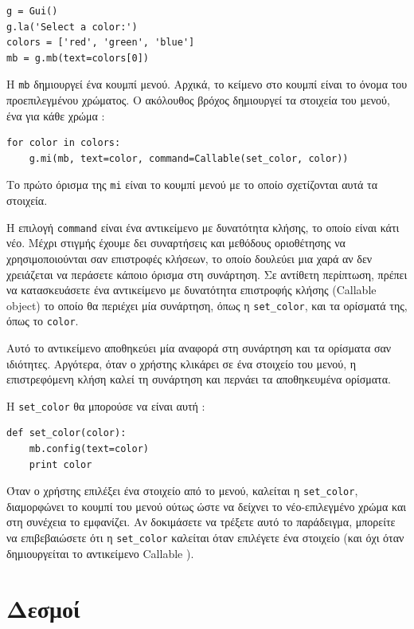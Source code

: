 \documentclass[10pt]{book}
\begin{document}
\begin{verbatim}
g = Gui()
g.la('Select a color:')
colors = ['red', 'green', 'blue']
mb = g.mb(text=colors[0])
\end{verbatim}
%
 Η  {\tt mb}  δημιουργεί ένα κουμπί μενού.  Αρχικά, το κείμενο στο κουμπί είναι το 
όνομα του προεπιλεγμένου χρώματος.  Ο ακόλουθος βρόχος δημιουργεί τα στοιχεία του μενού, ένα 
για κάθε χρώμα : 

\begin{verbatim}
for color in colors:
    g.mi(mb, text=color, command=Callable(set_color, color))
\end{verbatim}
%
 Το πρώτο όρισμα της  {\tt mi}  είναι το κουμπί μενού με το οποίο σχετίζονται 
αυτά τα στοιχεία.

Η επιλογή  {\tt command}  είναι ένα αντικείμενο με δυνατότητα κλήσης, το οποίο είναι 
κάτι νέο.  Μέχρι στιγμής έχουμε δει συναρτήσεις και μεθόδους οριοθέτησης να χρησιμοποιούνται 
σαν επιστροφές κλήσεων, το οποίο δουλεύει μια χαρά αν δεν χρειάζεται να περάσετε κάποιο όρισμα 
στη συνάρτηση.  Σε αντίθετη περίπτωση, πρέπει να κατασκευάσετε ένα αντικείμενο με δυνατότητα 
επιστροφής κλήσης  (Callable object)  το οποίο θα περιέχει μία συνάρτηση, όπως η  
\verb"set_color",  και τα ορίσματά της, όπως το  {\tt color}.

 Αυτό το αντικείμενο αποθηκεύει μία αναφορά στη συνάρτηση και τα ορίσματα σαν ιδιότητες.  
Αργότερα, όταν ο χρήστης κλικάρει σε ένα στοιχείο του μενού, η επιστρεφόμενη κλήση καλεί τη 
συνάρτηση και περνάει τα αποθηκευμένα ορίσματα.

Η  \verb"set_color"  θα μπορούσε να είναι αυτή :

\begin{verbatim}
def set_color(color):
    mb.config(text=color)
    print color
\end{verbatim}
%
 Όταν ο χρήστης επιλέξει ένα στοιχείο από το μενού, καλείται η  \verb"set_color",    
διαμορφώνει το κουμπί του μενού ούτως ώστε να δείχνει το νέο-επιλεγμένο χρώμα και στη 
συνέχεια το εμφανίζει.  Αν δοκιμάσετε να τρέξετε αυτό το παράδειγμα, μπορείτε να επιβεβαιώσετε 
ότι η  \verb"set_color"  καλείται όταν επιλέγετε ένα στοιχείο (και όχι όταν δημιουργείται το αντικείμενο  Callable ).



\section{Δεσμοί}
\end{document}
